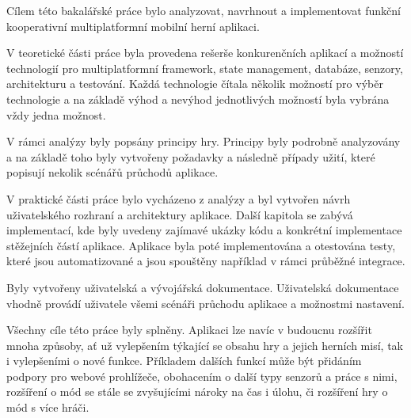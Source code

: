 \begin{conclusion}
Cílem této bakalářské práce bylo analyzovat, navrhnout a implementovat
funkční kooperativní multiplatformní mobilní herní aplikaci. 

V teoretické části práce byla provedena rešerše konkurenčních aplikací
a možností technologií pro multiplatformní framework, state management,
databáze, senzory, architekturu a testování.
Každá technologie čítala několik možností pro výběr technologie
a na základě výhod a nevýhod jednotlivých možností byla vybrána vždy
jedna možnost.

V rámci analýzy byly popsány principy hry.
Principy byly podrobně analyzovány a na základě toho byly vytvořeny
požadavky a následně případy užití,
které popisují nekolik scénářů průchodů aplikace.

V praktické části práce bylo vycházeno z analýzy
a byl vytvořen návrh uživatelského rozhraní
a architektury aplikace.
Další kapitola se zabývá implementací,
kde byly uvedeny zajímavé ukázky kódu
a konkrétní implementace stěžejních částí aplikace.
Aplikace byla poté implementována a otestována testy,
které jsou automatizované a jsou spouštěny například v rámci průběžné integrace.

Byly vytvořeny uživatelská a vývojářská dokumentace.
Uživatelská dokumentace vhodně provádí uživatele všemi scénáři průchodu
aplikace a možnostmi nastavení. 

Všechny cíle této práce byly splněny.
Aplikaci lze navíc v budoucnu rozšířit mnoha způsoby,
ať už vylepšením týkající se obsahu hry a jejich herních misí,
tak i vylepšeními o nové funkce.
Příkladem dalších funkcí může být přidáním podpory pro webové prohlížeče,
obohacením o další typy senzorů a práce s nimi,
rozšíření o mód se stále se zvyšujícími nároky na čas i úlohu,
či rozšíření hry o mód s více hráči.
\end{conclusion}
